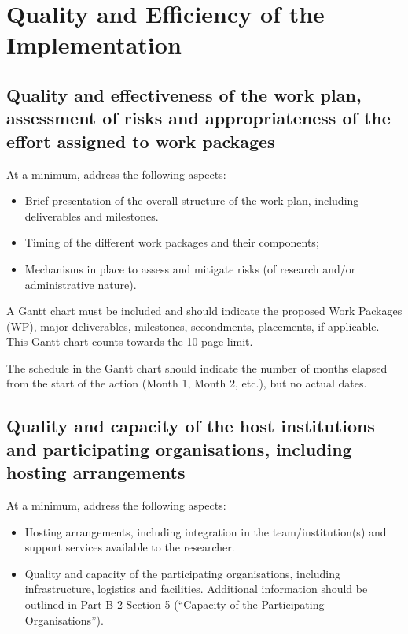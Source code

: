 \documentclass[12pt,draftproposal]{msca-pf}
\begin{document}
 

\section{Quality and Efficiency of the Implementation
            }
\label{sc:implementation}

\subsection{Quality and effectiveness of the work plan, assessment of risks and
    appropriateness of the effort assigned to work packages}
\label{ssc:implementation:workplan}

At a minimum, address the following aspects:

\begin{itemize}
    \item Brief presentation of the overall structure of the work plan,
    including deliverables and milestones.

    \item Timing of the different work packages and their components;

    \item Mechanisms in place to assess and mitigate risks (of research and/or
    administrative nature).
\end{itemize}

A Gantt chart must be included and should indicate the proposed Work Packages
(WP), major deliverables, milestones, secondments, placements, if applicable.
This Gantt chart counts towards the 10-page limit.

The schedule in the Gantt chart should indicate the number of months elapsed
from the start of the action (Month 1, Month 2, etc.), but no actual dates.

\subsection{Quality and capacity of the host institutions and participating
organisations, including hosting arrangements}
\label{ssc:implementation:host}

At a minimum, address the following aspects:

\begin{itemize}
    \item Hosting arrangements, including integration in the team/institution(s)
    and support services available to the researcher.

    \item Quality and capacity of the participating organisations, including
    infrastructure, logistics and facilities. Additional information should be
    outlined in Part B-2 Section 5 (``Capacity of the Participating Organisations'').
\end{itemize}
\end{document}
